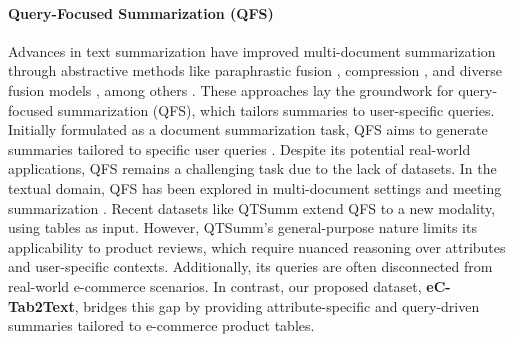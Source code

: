 \paragraph{Query-Focused Summarization (QFS)} 
Advances in text summarization have improved multi-document summarization through abstractive methods like paraphrastic fusion \cite{10.1145/3132847.3133106, nayeem-etal-2018-abstractive}, compression \cite{10.1007/978-3-030-15719-7_14, chowdhury-etal-2021-unsupervised}, and diverse fusion models \cite{FUAD2019216, nayeem2017methods}, among others \cite{nayeem-chali-2017-extract, chali-etal-2017-towards}. These approaches lay the groundwork for query-focused summarization (QFS), which tailors summaries to user-specific queries. Initially formulated as a document summarization task, QFS aims to generate summaries tailored to specific user queries \cite{dang-2006-duc}. Despite its potential real-world applications, QFS remains a challenging task due to the lack of datasets. In the textual domain, QFS has been explored in multi-document settings \cite{giorgi-etal-2023-open} and meeting summarization \cite{zhong-etal-2021-qmsum}. Recent datasets like QTSumm \cite{zhao2023qtsummqueryfocusedsummarizationtabular} extend QFS to a new modality, using tables as input. However, QTSumm's general-purpose nature limits its applicability to product reviews, which require nuanced reasoning over attributes and user-specific contexts. Additionally, its queries are often disconnected from real-world e-commerce scenarios. In contrast, our proposed dataset, \textbf{eC-Tab2Text}, bridges this gap by providing attribute-specific and query-driven summaries tailored to e-commerce product tables.